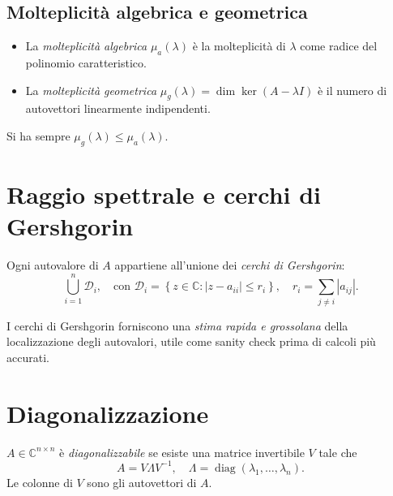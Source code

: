 \subsection{Molteplicità algebrica e geometrica}

\begin{definition}
\begin{itemize}
  \item La \emph{molteplicità algebrica} $\mu_a(\lambda)$ è la molteplicità di
        $\lambda$ come radice del polinomio caratteristico.
  \item La \emph{molteplicità geometrica} $\mu_g(\lambda) = \dim\ker(A-\lambda I)$
        è il numero di autovettori linearmente indipendenti.
\end{itemize}
Si ha sempre $\mu_g(\lambda) \leq \mu_a(\lambda)$.
\end{definition}

\section{Raggio spettrale e cerchi di Gershgorin}
\label{sec:gershgorin}

\begin{theorem}
\label{thm:gershgorin}
Ogni autovalore di $A$ appartiene all'unione dei \emph{cerchi di Gershgorin}:
\begin{equation}
  \bigcup_{i=1}^n \mathcal{D}_i, \quad \text{con } \mathcal{D}_i =
  \left\{ z \in \mathbb{C} : |z - a_{ii}| \leq r_i \right\},\quad
  r_i = \sum_{j \neq i} |a_{ij}|.
  \label{eq:gershgorin}
\end{equation}
\end{theorem}

I cerchi di Gershgorin forniscono una \emph{stima rapida e grossolana} della
localizzazione degli autovalori, utile come sanity check prima di calcoli più
accurati.

\section{Diagonalizzazione}
\label{sec:diagonalizzazione}

\begin{definition}
$A \in \mathbb{C}^{n \times n}$ è \emph{diagonalizzabile} se esiste una matrice
invertibile $V$ tale che
\begin{equation}
  A = V \Lambda V^{-1}, \quad \Lambda = \operatorname{diag}(\lambda_1, \ldots, \lambda_n).
  \label{eq:diag}
\end{equation}
Le colonne di $V$ sono gli autovettori di $A$.
\end{definition}

